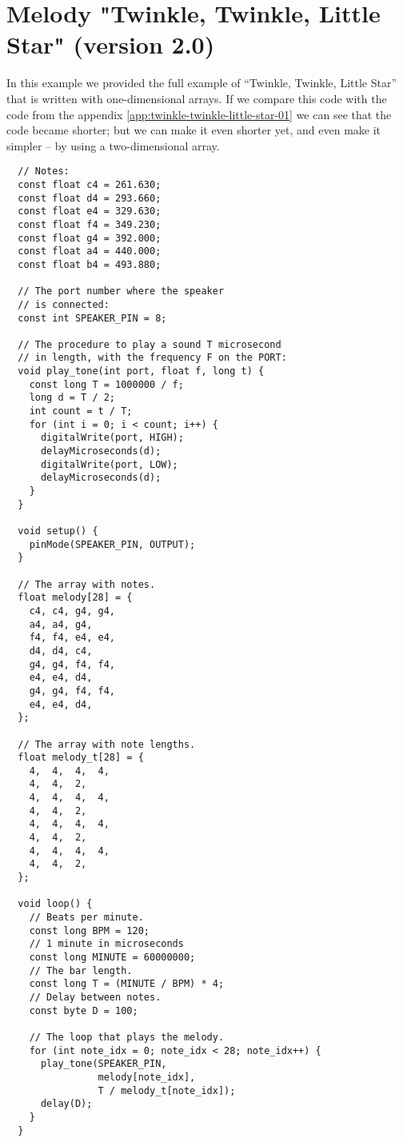 \documentclass[../sparc.tex]{subfiles}
\begin{document}
\newpage
\chapter{Melody "Twinkle, Twinkle, Little Star" (version 2.0)}
\label{app:twinkle-twinkle-little-star-02}

In this example we provided the full example of ``Twinkle, Twinkle, Little
Star'' that is written with one-dimensional arrays.  If we compare this code
with the code from the appendix \ref{app:twinkle-twinkle-little-star-01} we can
see that the code became shorter; but we can make it even shorter yet, and even
make it simpler -- by using a two-dimensional array.

\begin{verbatim}
  // Notes:
  const float c4 = 261.630;
  const float d4 = 293.660;
  const float e4 = 329.630;
  const float f4 = 349.230;
  const float g4 = 392.000;
  const float a4 = 440.000;
  const float b4 = 493.880;

  // The port number where the speaker
  // is connected:
  const int SPEAKER_PIN = 8;

  // The procedure to play a sound T microsecond
  // in length, with the frequency F on the PORT:
  void play_tone(int port, float f, long t) {
    const long T = 1000000 / f;
    long d = T / 2;
    int count = t / T;
    for (int i = 0; i < count; i++) {
      digitalWrite(port, HIGH);
      delayMicroseconds(d);
      digitalWrite(port, LOW);
      delayMicroseconds(d);
    }
  }

  void setup() {
    pinMode(SPEAKER_PIN, OUTPUT);
  }

  // The array with notes.
  float melody[28] = {
    c4, c4, g4, g4,
    a4, a4, g4,
    f4, f4, e4, e4,
    d4, d4, c4,
    g4, g4, f4, f4,
    e4, e4, d4,
    g4, g4, f4, f4,
    e4, e4, d4,
  };

  // The array with note lengths.
  float melody_t[28] = {
    4,  4,  4,  4,
    4,  4,  2,
    4,  4,  4,  4,
    4,  4,  2,
    4,  4,  4,  4,
    4,  4,  2,
    4,  4,  4,  4,
    4,  4,  2,
  };

  void loop() {
    // Beats per minute.
    const long BPM = 120;
    // 1 minute in microseconds
    const long MINUTE = 60000000;
    // The bar length.
    const long T = (MINUTE / BPM) * 4;
    // Delay between notes.
    const byte D = 100;

    // The loop that plays the melody.
    for (int note_idx = 0; note_idx < 28; note_idx++) {
      play_tone(SPEAKER_PIN,
                melody[note_idx],
                T / melody_t[note_idx]);
      delay(D);
    }
  }
\end{verbatim}
\end{document}
